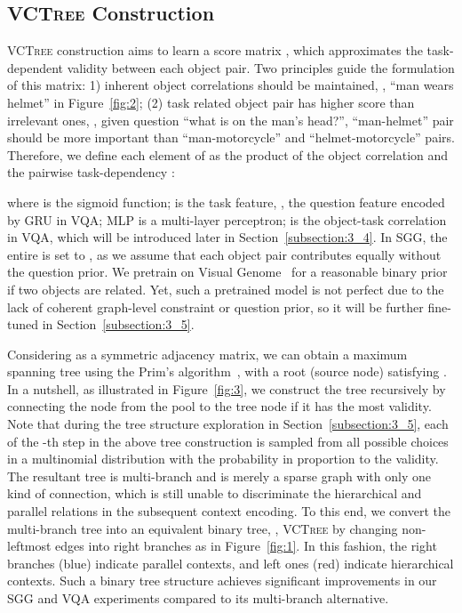 \documentclass[10pt,twocolumn,letterpaper]{article}
\begin{document}
\subsection{\textsc{VCTree} Construction}
\label{subsection:3_1}
\textsc{VCTree} construction aims to learn a score matrix , which approximates the task-dependent validity between each object pair. Two principles guide the formulation of this matrix: 1) inherent object correlations should be maintained, \eg, ``man wears helmet'' in Figure~\ref{fig:2}; (2) task related object pair has higher score than irrelevant ones, \eg, given question ``what is on the man's head?'', ``man-helmet'' pair should be more important than ``man-motorcycle'' and ``helmet-motorcycle'' pairs. Therefore, we define each element of  as the product of the object correlation  and the pairwise task-dependency :

where  is the sigmoid function;  is the task feature, \eg, the question feature encoded by GRU in VQA; MLP is a multi-layer perceptron;  is the object-task correlation in VQA, which will be introduced later in Section~\ref{subsection:3_4}. In SGG, the entire  is set to , as we assume that each object pair contributes equally without the question prior. We pretrain  on Visual Genome~\cite{krishna2017visual} for a reasonable binary prior if two objects are related. Yet, such a pretrained model is not perfect due to the lack of coherent graph-level constraint or question prior, so it will be further fine-tuned in Section~\ref{subsection:3_5}.

Considering  as a symmetric adjacency matrix, we can obtain a maximum spanning tree using the Prim's algorithm~\cite{prim1957shortest}, with a root (source node)  satisfying . In a nutshell, as illustrated in Figure~\ref{fig:3}, we construct the tree recursively by connecting the node from the pool to the tree node if it has the most validity. Note that during the tree structure exploration in Section~\ref{subsection:3_5}, each of the -th step  in the above tree construction is sampled from all possible choices in a multinomial distribution with the probability  in proportion to the validity. The resultant tree is multi-branch and is merely a sparse graph with only one kind of connection, which is still unable to discriminate the hierarchical and parallel relations in the subsequent context encoding. To this end, we convert the multi-branch tree into an equivalent binary tree, \ie, \textsc{VCTree} by changing non-leftmost edges into right branches as in Figure~\ref{fig:1}. In this fashion, the right branches (blue) indicate parallel contexts, and left ones (red) indicate hierarchical contexts. Such a binary tree structure achieves significant improvements in our SGG and VQA experiments compared to its multi-branch alternative.
\end{document}
